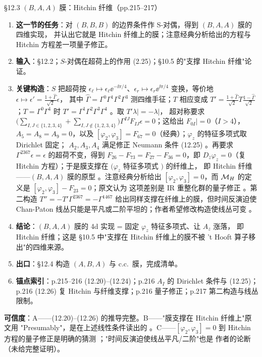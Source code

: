 \begin{kcard}{\S12.3 $(B,A,A)$ 膜：Hitchin 纤维（pp.215--217）}
\begin{enumerate}[label=\textbf{\arabic*}]
\item \textbf{这一节的任务}：对 $(B,B,B)$ 的边界条件作 S-对偶，得到 $(B,A,A)$ 膜的四维实现，
  并认出它就是 Hitchin 纤维上的膜；注意经典分析给出的方程与 Hitchin 方程差一项量子修正。
\item \textbf{输入}：\S12.2；$S$-对偶在超荷上的作用 (2.25)；\S10.5 的"支撑 Hitchin 纤维"论证。
\item \textbf{关键构造}：$S$ 把超荷按
  $\epsilon_\ell\mapsto\epsilon_\ell\ee^{-\ii\pi/4}$、$\epsilon_r\mapsto\epsilon_r
  \ee^{\ii\pi/4}$ 变换，等价地 $\epsilon\mapsto\epsilon'=\frac{1+\hat\Gamma}{\sqrt2}\epsilon$，
  其中 $\hat\Gamma=\Gamma^0\Gamma^1\Gamma^2\Gamma^3$ 测四维手征；$T$ 相应变成
  $T'=\frac{1+\hat\Gamma}{\sqrt2}T\frac{1-\hat\Gamma}{\sqrt2}$；$T=\Gamma^0\Gamma^4$ 时
  $T'=\Gamma^1\Gamma^2\Gamma^3\Gamma^4$ \pA{}。取 $T'\lambda|=-\lambda|$，
  超对称要求 $\big(\sum_{I,J\in\{1,2,3,4\}}+\sum_{I,J\notin\{1,2,3,4\}}\big)
  \Gamma^{IJ}F_{IJ}\epsilon=0$；这给出 $F_{0I}|=0$（$I>4$），$A_5=A_8=A_9=0$，以及
  $[\varphi_2,\varphi_3]=F_{67}=0$（经典）；$\varphi_z$ 的特征多项式取 Dirichlet 固定；
  $A_2,A_3,A_4$ 满足修正 Neumann 条件 (12.25) \pA{}。再要求
  $\Gamma^{2367}\epsilon=\epsilon$ 的超荷不变，得到 $F_{26}-F_{73}=F_{27}-F_{36}=0$，即
  $D_{\bar z}\varphi_z=0$（复 Hitchin 方程）；于是膜支撑在 $(\varphi_z$ 特征多项式 $)$ 的纤维上，
  即 Hitchin 纤维——$(B,A,A)$ 膜的原型 \pA{}。注意经典分析给出
  $[\varphi_2,\varphi_3]=0$，而 $\mathcal{M}_H$ 的定义是 $[\varphi_2,\varphi_3]-F_{23}=0$；原文认为
  这项差别是 IR 重整化群的量子修正 \pC{}。第二构造
  $T''=-T'\Gamma^{2367}=-\Gamma^{1467}$ 给出同样支撑在纤维上的膜，但时间反演迫使 Chan-Paton
  线丛只能是平凡或二阶平坦的；作者希望修改构造使线丛可变 \pA{}。
\item \textbf{结论}：$(B,A,A)$ 膜的 4d 实现 = 固定 $\varphi_z$ 特征多项式、让 $A_z$ 涨落，
  即 Hitchin 纤维；这是 \S10.5 中"支撑在 Hitchin 纤维上的膜不被 't Hooft 算子移出"的四维来源。
\item \textbf{出口}：\S12.4 构造 $(A,B,A)$ 与 c.c.\ 膜，完成清单。
\item \textbf{锚点索引}：p.215--216 (12.20)--(12.24)；p.216 $A_I$ 的 Dirichlet 条件与 (12.25)；
  p.216 (12.26) 复 Hitchin 与纤维支撑；p.216 量子修正；p.217 第二构造与线丛限制。
\end{enumerate}
\textbf{可信度}：A——(12.20)--(12.26) 的推导完整。B——"膜支撑在 Hitchin 纤维上"原文用
"Presumably"，是在上述线性条件读出的 \pB{}。C——$[\varphi_2,\varphi_3]=0$ 到
Hitchin 方程的量子修正是明确的猜测 \pC{}；"时间反演迫使线丛平凡/二阶"也是
作者的论断（未给完整证明）\pC{}。
\end{kcard}

